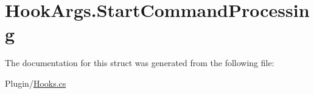 \hypertarget{structOTA_1_1Plugin_1_1HookArgs_1_1StartCommandProcessing}{}\section{Hook\+Args.\+Start\+Command\+Processing}
\label{structOTA_1_1Plugin_1_1HookArgs_1_1StartCommandProcessing}


The documentation for this struct was generated from the following file\+:\begin{DoxyCompactItemize}
\item 
Plugin/\hyperlink{Hooks_8cs}{Hooks.\+cs}\end{DoxyCompactItemize}
